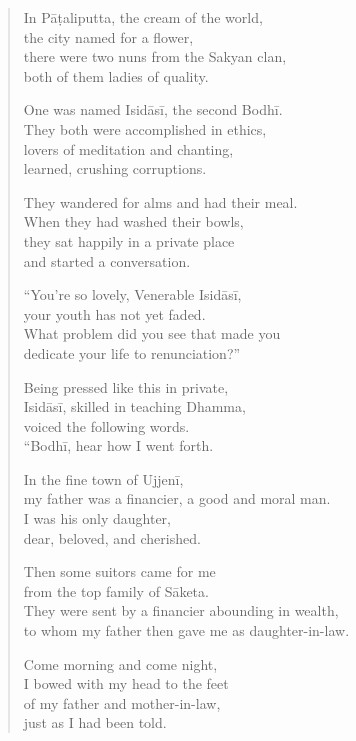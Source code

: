 \documentclass[12pt,openany]{book}%
\begin{document}
\begin{verse}%
In \textsanskrit{Pāṭaliputta}, the cream of the world, \\
the city named for a flower, \\
there were two nuns from the Sakyan clan, \\
both of them ladies of quality. 

One was named \textsanskrit{Isidāsī}, the second \textsanskrit{Bodhī}. \\
They both were accomplished in ethics, \\
lovers of meditation and chanting, \\
learned, crushing corruptions. 

They wandered for alms and had their meal. \\
When they had washed their bowls, \\
they sat happily in a private place \\
and started a conversation. 

“You’re so lovely, Venerable \textsanskrit{Isidāsī}, \\
your youth has not yet faded. \\
What problem did you see that made you \\
dedicate your life to renunciation?” 

Being pressed like this in private, \\
\textsanskrit{Isidāsī}, skilled in teaching Dhamma, \\
voiced the following words. \\
“\textsanskrit{Bodhī}, hear how I went forth. 

In the fine town of \textsanskrit{Ujjenī}, \\
my father was a financier, a good and moral man. \\
I was his only daughter, \\
dear, beloved, and cherished. 

Then some suitors came for me \\
from the top family of \textsanskrit{Sāketa}. \\
They were sent by a financier abounding in wealth, \\
to whom my father then gave me as daughter-in-law. 

Come morning and come night, \\
I bowed with my head to the feet \\
of my father and mother-in-law, \\
just as I had been told. 


\end{verse}
\end{document}

